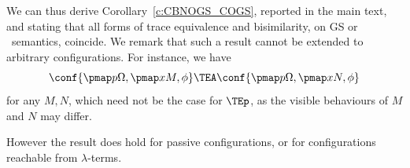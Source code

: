 

We can thus derive 
Corollary~\ref{c:CBNOGS_COGS}, reported in the main text, and  stating that all forms of
trace equivalence and bisimilarity, on GS or \piI\ semantics, coincide.   
%
We remark that such a  result  cannot be extended to arbitrary configurations.
For instance, 
we have 
\[ \conf {\pmap  p \Omega ,  \pmap  x M , \phi} 
\TEA
\conf {\pmap  p \Omega ,  \pmap  x N , \phi} 
\]
for any $M,N$, which need not be the case for 
$\TEp$, as the visible behaviours of $M$ and $N$ may differ. 


However the result does  hold for passive configurations, or for configurations reachable from
$\lambda$-terms.



\fi
% 
%

